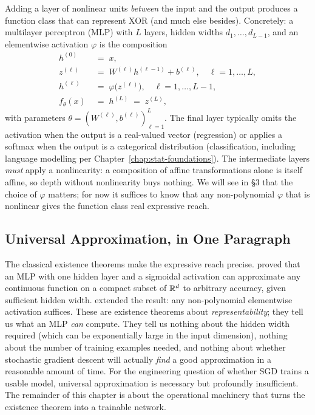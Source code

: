 Adding a layer of nonlinear units \emph{between} the input and the
output produces a function class that can represent XOR (and much
else besides). Concretely: a multilayer perceptron (MLP) with $L$
layers, hidden widths $d_1, \dots, d_{L-1}$, and an elementwise
activation $\varphi$ is the composition
\begin{align}
  h^{(0)} &\;=\; x, \nonumber \\
  z^{(\ell)} &\;=\; W^{(\ell)} h^{(\ell-1)} + b^{(\ell)},
    \quad \ell = 1, \dots, L, \nonumber \\
  h^{(\ell)} &\;=\; \varphi\!\bigl(z^{(\ell)}\bigr),
    \quad \ell = 1, \dots, L-1, \nonumber \\
  f_\theta(x) &\;=\; h^{(L)} \;=\; z^{(L)},
  \label{eq:nn-mlp}
\end{align}
with parameters $\theta = (W^{(\ell)}, b^{(\ell)})_{\ell=1}^{L}$.
The final layer typically omits the activation when the output is
a real-valued vector (regression) or applies a softmax when the
output is a categorical distribution (classification, including
language modelling per Chapter~\ref{chap:stat-foundations}). The intermediate layers
\emph{must} apply a nonlinearity: a composition of affine
transformations alone is itself affine, so depth without
nonlinearity buys nothing. We will see in §3 that the choice of
$\varphi$ matters; for now it suffices to know that any
non-polynomial $\varphi$ that is nonlinear gives the function
class real expressive reach.

\subsection{Universal Approximation, in One Paragraph}

The classical existence theorems make the expressive reach
precise. \citet{cybenko1989approximation} proved that an MLP with
one hidden layer and a sigmoidal activation can approximate any
continuous function on a compact subset of $\mathbb{R}^d$ to arbitrary
accuracy, given sufficient hidden width.
\citet{hornik1991approximation} extended the result: any
non-polynomial elementwise activation suffices. These are
existence theorems about \emph{representability}; they tell us
what an MLP \emph{can} compute. They tell us nothing about the
hidden width required (which can be exponentially large in the
input dimension), nothing about the number of training examples
needed, and nothing about whether stochastic gradient descent
will actually \emph{find} a good approximation in a reasonable
amount of time. For the engineering question of whether SGD
trains a usable model, universal approximation is necessary but
profoundly insufficient. The remainder of this chapter is about
the operational machinery that turns the existence theorem into a
trainable network.


